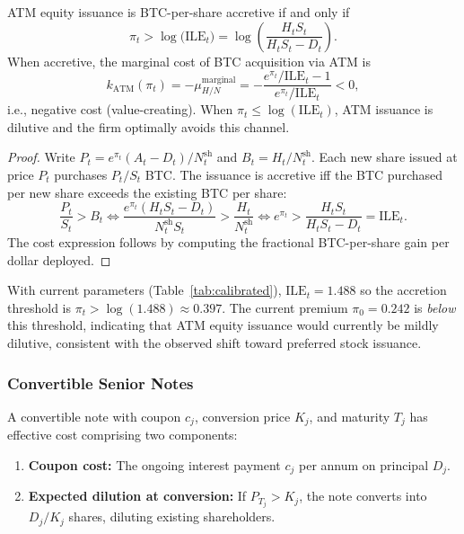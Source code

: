 \begin{proposition}
\label{prop:atm_threshold}
ATM equity issuance is BTC-per-share accretive if and only if
\begin{equation}
  \pi_t > \log\!\bigl(\mathrm{ILE}_t\bigr) = \log\!\left(\frac{H_t S_t}{H_t S_t - D_t}\right).
  \label{eq:atm_accretive}
\end{equation}
When accretive, the marginal cost of BTC acquisition via ATM is
\begin{equation}
  k_{\mathrm{ATM}}(\pi_t) = -\mu_{H/N}^{\mathrm{marginal}}
  = -\frac{e^{\pi_t}/\mathrm{ILE}_t - 1}{e^{\pi_t}/\mathrm{ILE}_t} < 0,
  \label{eq:atm_cost}
\end{equation}
i.e., negative cost (value-creating). When $\pi_t \le \log(\mathrm{ILE}_t)$,
ATM issuance is dilutive and the firm optimally avoids this channel.
\end{proposition}

\begin{proof}
Write $P_t = e^{\pi_t}(A_t - D_t)/N_t^{\mathrm{sh}}$ and
$B_t = H_t / N_t^{\mathrm{sh}}$.
Each new share issued at price $P_t$ purchases $P_t / S_t$ BTC.
The issuance is accretive iff the BTC purchased per new share exceeds
the existing BTC per share:
\[
  \frac{P_t}{S_t} > B_t
  \iff
  \frac{e^{\pi_t}(H_t S_t - D_t)}{N_t^{\mathrm{sh}} S_t} > \frac{H_t}{N_t^{\mathrm{sh}}}
  \iff
  e^{\pi_t} > \frac{H_t S_t}{H_t S_t - D_t} = \mathrm{ILE}_t.
\]
The cost expression follows by computing the fractional BTC-per-share
gain per dollar deployed.
\end{proof}

\begin{remark}
With current parameters (Table~\ref{tab:calibrated}), $\mathrm{ILE}_t = 1.488$
so the accretion threshold is $\pi_t > \log(1.488) \approx 0.397$.
The current premium $\pi_0 = 0.242$ is \emph{below} this threshold,
indicating that ATM equity issuance would currently be mildly dilutive,
consistent with the observed shift toward preferred stock issuance.
\end{remark}

\subsubsection{Convertible Senior Notes}

A convertible note with coupon $c_j$, conversion price $K_j$, and maturity $T_j$
has effective cost comprising two components:
\begin{enumerate}
  \item \textbf{Coupon cost:} The ongoing interest payment $c_j$ per annum
    on principal $D_j$.
  \item \textbf{Expected dilution at conversion:} If $P_{T_j} > K_j$,
    the note converts into $D_j / K_j$ shares, diluting existing shareholders.
\end{enumerate}

